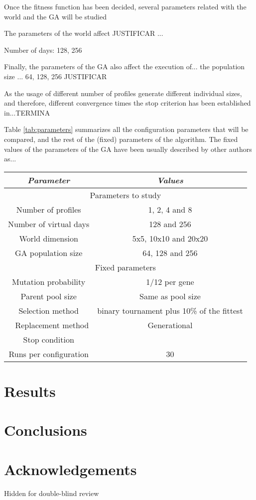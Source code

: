 \documentclass[runningheads,a4paper]{llncs}
\begin{document}
Once the fitness function has been decided, several parameters related with the world and the GA will be studied

The parameters of the world affect  JUSTIFICAR ...


Number of days: 128, 256


Finally, the parameters of the GA also affect the execution of... the population size ... 64, 128, 256 JUSTIFICAR

As the usage of different number of profiles generate different individual sizes, and therefore, different convergence times the stop criterion has been established in...TERMINA

Table \ref{tab:parameters} summarizes all the configuration parameters that will be compared, and the rest of the (fixed) parameters of the algorithm. The fixed values of the parameters of the GA have been usually described by other authors as...

\begin{table*}
\begin{center}
\begin{tabular}{|c|c|}
\hline
{\em Parameter} & {\em Values} \\\hline \hline
\multicolumn{2}{c}{Parameters to study} \\
Number of profiles & 1, 2, 4 and 8 \\\hline
Number of virtual days &  128 and 256 \\ \hline
World dimension &  5x5, 10x10 and 20x20 \\ \hline
GA population size & 64, 128 and 256 \\ \hline
\multicolumn{2}{c}{Fixed parameters} \\ \hline
Mutation probability & 1/12 per gene \\ \hline
Parent pool size & Same as pool size \\ \hline
Selection method & binary tournament plus 10\% of the fittest \\ \hline
Replacement method & Generational\\ \hline
Stop condition & \\ \hline
Runs per configuration & 30 \\ \hline
\end{tabular}
\caption{Parameters used in the experiments.}
\label{tab:parameters}
\end{center}
\end{table*}


\section{Results}
\label{sec:res}

\section{Conclusions}

\section*{Acknowledgements}

Hidden for double-blind review



\end{document}
